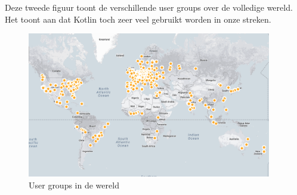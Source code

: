 Deze tweede figuur toont de verschillende user groups over de volledige wereld. Het toont aan dat Kotlin toch zeer veel gebruikt worden in onze streken.
\begin{figure} [ht]
	\centering
	\includegraphics[width=0.95\textwidth]{img/KUGmap.png}
	\caption{User groups in de wereld \cite{JetBrains12}}
	\label{fig:usergroups}
\end{figure}





